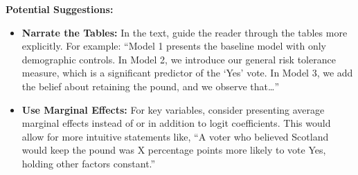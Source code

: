 \documentclass[
  letterpaper,
  DIV=11,
  numbers=noendperiod]{scrartcl}
\providecommand{\tightlist}{%
  \setlength{\itemsep}{0pt}\setlength{\parskip}{0pt}}\usepackage{longtable,booktabs,array}
\begin{document}
\textbf{Potential Suggestions:}

\begin{itemize}
\tightlist
\item
  \textbf{Narrate the Tables:} In the text, guide the reader through the
  tables more explicitly. For example: ``Model 1 presents the baseline
  model with only demographic controls. In Model 2, we introduce our
  general risk tolerance measure, which is a significant predictor of
  the `Yes' vote. In Model 3, we add the belief about retaining the
  pound, and we observe that\ldots{}''
\item
  \textbf{Use Marginal Effects:} For key variables, consider presenting
  average marginal effects instead of or in addition to logit
  coefficients. This would allow for more intuitive statements like, ``A
  voter who believed Scotland would keep the pound was X percentage
  points more likely to vote Yes, holding other factors constant.''
\end{itemize}
\end{document}
